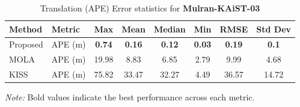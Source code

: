 \begin{table}[ht]
	\centering
	\renewcommand{\arraystretch}{0.6}
	\setlength{\tabcolsep}{10pt}
	\caption{Translation (APE)  Error statistics for \textbf{Mulran-KAiST-03}}
	\label{tab:ape_rot_kaist_03}
	\begin{tabular}{@{}llcccccc@{}}
		\toprule
		\textbf{Method} & \textbf{Metric} & \textbf{Max} & \textbf{Mean} & \textbf{Median} & \textbf{Min} & \textbf{RMSE} & \textbf{Std Dev} \\
		\midrule
		Proposed & APE (m) & \textbf{0.74} &\textbf{ 0.16 }& \textbf{0.12} & \textbf{0.03} & \textbf{0.19} &\textbf{ 0.1} \\
		MOLA     & APE (m) & 19.98 & 8.83 & 6.85 & 2.79 & 9.99 & 4.68 \\
		KISS     & APE (m) & 75.82 & 33.47 & 32.27 & 4.49 & 36.57 & 14.72 \\
		\bottomrule
	\end{tabular}
	{\footnotesize \textit{Note:} Bold values indicate the best performance across each metric.}
\end{table}


